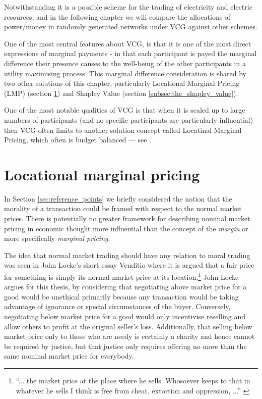 Notwithstanding it is a possible scheme for the trading of electricity and electric resources, and in the following chapter we will compare the allocations of power/money in randomly generated networks under VCG against other schemes.

One of the most central features about VCG, is that it is one of the most direct expressions of marginal payments - in that each participant is payed the marginal difference their presence causes to the well-being of the other participants in a utility maximising process.
This marginal difference consideration is shared by two other solutions of this chapter, particularly Locational Marginal Pricing (LMP) (section \ref{sec:solutions_LMP}) and Shapley Value (section \ref{subsec:the_shapley_value}).

One of the most notable qualities of VCG is that when it is scaled up to large numbers of participants (and no specific participants are particularly influential) then VCG often limits to another solution concept called Locatinal Marginal Pricing, which often is budget balanced --- see \cite{NATH2019673, 8430852}.


\section{Locational marginal pricing}\label{sec:solutions_LMP}

In Section \ref{sec:reference_points} we briefly considered the notion that %
the morality of a transaction could be framed with respect to the normal market prices.
There is potentially no greater framework for describing nominal market pricing in economic thought more influential than the concept of the \textit{margin} or more specifically \textit{marginal pricing}.

The idea that normal market trading should have any relation to moral trading was seen in John Locke's short essay Venditio where it is argued that a fair price for something is simply its normal market price at its location.\footnote{``... the market price at the place where he sells. Whosoever keeps to that in whatever he sells I think is free from cheat, extortion and oppression, ...'' \citep{locke2003locke}}
John Locke argues for this thesis, by considering that negotiating above market price for a good would be unethical primarily because any transaction would be taking advantage of ignorance or special circumstances of the buyer.
Conversely, negotiating below market price for a good would only incentivise reselling and allow others to profit at the original seller's loss.
Additionally, that selling below market price only to those who are needy is certainly a charity and hence cannot be required by justice, but that justice only requires offering no more than the same nominal market price for everybody.


